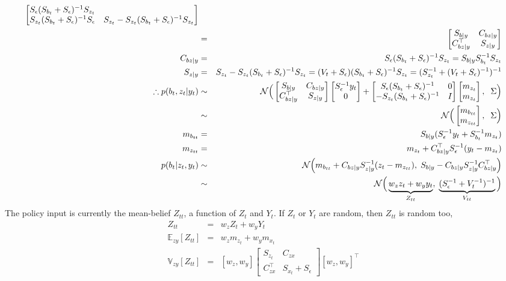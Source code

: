 \documentclass[9pt]{article}
\newcommand{\E}{{\mathbb E}}
\newcommand{\V}{{\mathbb V}}
\newcommand{\N}{\mathcal{N}}
\newcommand{\m}[1]{m_{#1}}                  %
\newcommand{\s}[1]{S_{#1}}                  %
\newcommand{\Sn}{\s{\epsilon}}              %
\newcommand{\now}[1]{#1_t}                  %
\newcommand{\pno}[1]{#1_{t}}  %
\newcommand{\uno}[1]{#1_{tt}}              %
\newcommand{\inv}{^{-1}}
\newcommand{\nnn}{\nonumber \\}
\newcommand{\nn}{\nonumber}
\begin{document}
\begin{eqnarray}
\begin{bmatrix}
   \Sn (\s{\pno{b}} + \Sn)\inv \s{\pno{z}} \\
   \s{\pno{z}} (\s{\pno{b}} + \Sn)\inv \Sn &
   \s{\pno{z}}-\s{\pno{z}} (\s{\pno{b}}+\Sn)\inv \s{\pno{z}} \end{bmatrix} \nnn
   &=& \begin{bmatrix} \s{b|y} & \CbzGy \\ \CbzGy^\top & \s{z|y} \end{bmatrix} \nnn
 \CbzGy
   &=& \Sn (\s{\pno{b}} + \Sn)\inv \s{\pno{z}} = \s{b|y} \s{\pno{b}}\inv \s{\pno{z}} \nnn
 \s{z|y}
   &=& \s{\pno{z}}-\s{\pno{z}} (\s{\pno{b}}+\Sn)\inv \s{\pno{z}}
   = (\pno{V} + \Sn)(\s{\pno{b}} + \Sn)\inv \s{\pno{z}}
   = (\s{\pno{z}}\inv+(\pno{V}+\Sn)\inv)\inv \nnn
 \therefore p(\pno{b},\pno{z}|\now{y})
   &\sim& \N \Big(\begin{bmatrix} \s{b|y} & \CbzGy \\ \CbzGy^\top & \s{z|y} \end{bmatrix} \begin{bmatrix} \Sn\inv\now{y} \\ 0 \end{bmatrix} + \begin{bmatrix} \Sn (\s{\pno{b}} + \Sn)\inv & 0 \\ -\s{\pno{z}}(\s{\pno{b}} + \Sn)\inv & I \end{bmatrix} \begin{bmatrix} \m{\pno{z}} \\ \m{\pno{z}} \end{bmatrix}, \;\; \Sigma \Big) \nnn
   &\sim& \N \Big(\begin{bmatrix} \m{\uno{b}} \\ \m{\uno{z}} \end{bmatrix}, \;\; \Sigma \Big) \\
 \m{\uno{b}}
   &=& \s{b|y} (\Sn\inv \now{y} + \s{\pno{b}}\inv \m{\pno{z}}) \nnn
 \m{\uno{z}}
   &=& \m{\pno{z}}  + \CbzGy^\top \Sn\inv (\now{y}-\m{\pno{z}}) \nnn
 p(\pno{b}|\pno{z},\now{y})
   &\sim& \N \Big( \m{\uno{b}} + \CbzGy \s{z|y}\inv (\pno{z} - \m{\uno{z}}),
   \; \s{b|y} - \CbzGy\s{z|y}\inv\CbzGy^\top \Big) \nnn
   &\sim& \N \Big( \underbrace{w_z \pno{z} + w_y \now{y}}_{\uno{Z}},
   \; \underbrace{(\Sn\inv+\pno{V}\inv)\inv}_{\uno{V}} \Big) \nn
\end{eqnarray}
%
The policy input is currently the mean-belief $\uno{Z}$, a function of $\pno{Z}$ and $\now{Y}$.
If $\pno{Z}$ or $\now{Y}$ are random, then $\uno{Z}$ is random too,
\begin{eqnarray}
 \uno{Z}
  &=& w_z \pno{Z} + w_y \now{Y} \nnn
 \E_{zy}[\uno{Z}]
   &=& w_z \m{\pno{z}} + w_y \m{\now{x}} \nnn
 \V_{zy}[\uno{Z}]
   &=& [w_z, w_y] \begin{bmatrix} \s{\pno{z}} & C_{zx} \\ C_{zx}^\top & \s{\now{x}}+\Sn \end{bmatrix} [w_z, w_y]^\top \nn
\end{eqnarray}
\end{document}
